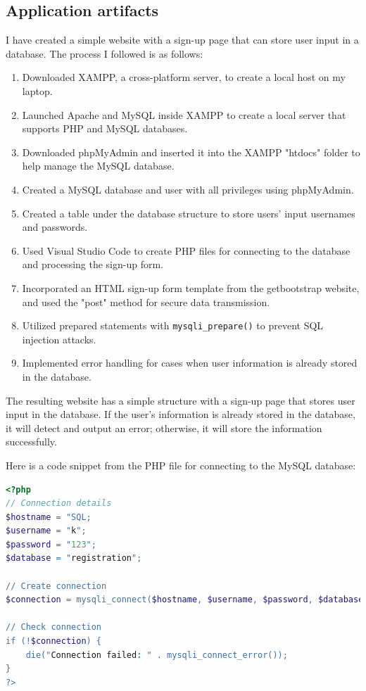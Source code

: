 \documentclass[a4paper, 11pt]{report}
\begin{document}
\subsection{Application artifacts}

I have created a simple website with a sign-up page that can store user input in a database. The process I followed is as follows:

\begin{enumerate}
    \item Downloaded XAMPP, a cross-platform server, to create a local host on my laptop.
    \item Launched Apache and MySQL inside XAMPP to create a local server that supports PHP and MySQL databases.
    \item Downloaded phpMyAdmin and inserted it into the XAMPP "htdocs" folder to help manage the MySQL database.
    \item Created a MySQL database and user with all privileges using phpMyAdmin.
    \item Created a table under the database structure to store users' input usernames and passwords.
    \item Used Visual Studio Code to create PHP files for connecting to the database and processing the sign-up form.
    \item Incorporated an HTML sign-up form template from the getbootstrap website, and used the "post" method for secure data transmission.
    \item Utilized prepared statements with \texttt{mysqli\_prepare()} to prevent SQL injection attacks.
    \item Implemented error handling for cases when user information is already stored in the database.
\end{enumerate}

The resulting website has a simple structure with a sign-up page that stores user input in the database. If the user's information is already stored in the database, it will detect and output an error; otherwise, it will store the information successfully.

Here is a code snippet from the PHP file for connecting to the MySQL database:

\begin{lstlisting}[language=php]
<?php
// Connection details
$hostname = "SQL;
$username = "k";
$password = "123";
$database = "registration";

// Create connection
$connection = mysqli_connect($hostname, $username, $password, $database);

// Check connection
if (!$connection) {
    die("Connection failed: " . mysqli_connect_error());
}
?>
\end{lstlisting}
\end{document}
